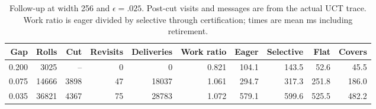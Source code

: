\begin{table}[t]
\centering\small
\setlength{\tabcolsep}{3pt}
\caption{Follow-up at width 256 and $\epsilon=.025$. Post-cut visits and messages are from the actual UCT trace. Work ratio is eager divided by selective through certification; times are mean ms including retirement.}
\label{tab:ta-gap}
\begin{tabular}{rrrrrrrrrr}\toprule
Gap & Rolls & Cut & Revisits & Deliveries & Work ratio & Eager & Selective & Flat & Covers\\\midrule
0.200 & 3025 & -- & 0 & 0 & 0.821 & 104.1 & 143.5 & 52.6 & 45.5\\
0.075 & 14666 & 3898 & 47 & 18037 & 1.061 & 294.7 & 317.3 & 251.8 & 186.0\\
0.035 & 36821 & 4367 & 75 & 28783 & 1.072 & 579.1 & 599.6 & 525.5 & 482.2\\
\bottomrule\end{tabular}
\end{table}
